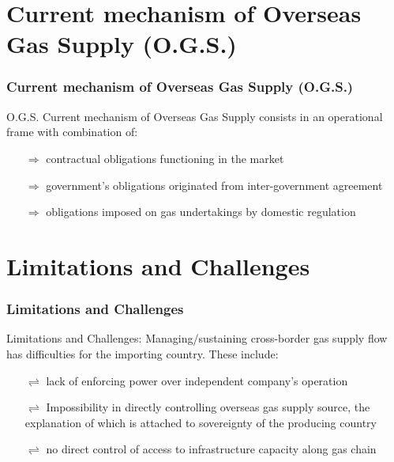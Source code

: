 \documentclass[pdflatex,compress,10pt,
	xcolor={dvipsnames,dvipsnames,svgnames,x11names,table},
	hyperref={
	colorlinks = true,
	breaklinks = true, 
	citecolor=NavyBlue, 
	urlcolor = blue, 
	filecolor=magenta} 
]{beamer}
\begin{document}
\section{Current mechanism of Overseas Gas Supply (O.G.S.)}
\begin{frame}\frametitle{Current mechanism of Overseas Gas Supply (O.G.S.)}

\begin{alertblock}{O.G.S.}
Current mechanism of Overseas Gas Supply consists in an operational frame with combination of:
\begin{itemize}
	\item [$\Rightarrow$] contractual obligations functioning in the market
	\item [$\Rightarrow$] government’s obligations originated from inter-government agreement
	\item [$\Rightarrow$] obligations imposed on gas undertakings by domestic regulation
\end{itemize}
\end{alertblock}

\end{frame}

\section{Limitations and Challenges}
\begin{frame}\frametitle{Limitations and Challenges}

\begin{examples}{Limitations and Challenges:}
Managing/sustaining cross-border gas supply flow has difficulties for the importing country. These include:
\begin{itemize}
	\item [$\rightleftharpoons$] lack of enforcing power over independent company’s operation
	\item [$\rightleftharpoons$] Impossibility in directly controlling overseas gas supply source, the explanation of which is attached to sovereignty of the producing country
	\item [$\rightleftharpoons$] no direct control of access to infrastructure capacity along gas chain
\end{itemize}
\end{examples}

\end{frame}
\end{document}
